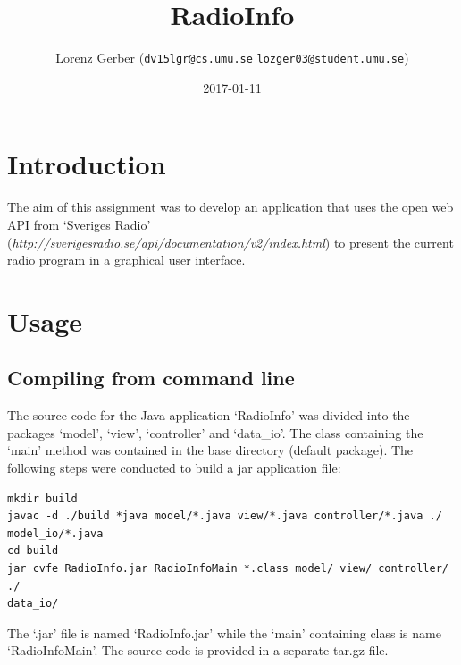 \documentclass[a4paper,11pt,twoside]{article}
\title{RadioInfo}
\author{Lorenz Gerber ({\tt{dv15lgr@cs.umu.se}} {\tt{lozger03@student.umu.se}})}
\date{2017-01-11}
\begin{document}
\lstset{language=C}
\maketitle
\thispagestyle{empty}
\newpage
\tableofcontents
\thispagestyle{empty}
\newpage

\clearpage
{}

\section{Introduction}
The aim of this assignment was to develop an application that uses the open web API from `Sveriges Radio' (\textit{http://sverigesradio.se/api/documentation/v2/index.html}) to present the current radio program in a graphical user interface. 

\section{Usage} 

\subsection{Compiling from command line}
The source code for the Java application `RadioInfo' was divided into the packages `model', `view', `controller' and `data\_io'. The class containing the `main' method was contained in the base directory (default package). The following steps were conducted to build a jar application file:

\begin{verbatim}
mkdir build
javac -d ./build *java model/*.java view/*.java controller/*.java ./
model_io/*.java
cd build
jar cvfe RadioInfo.jar RadioInfoMain *.class model/ view/ controller/ ./
data_io/
\end{verbatim}

The `.jar' file is named `RadioInfo.jar' while the `main' containing class is name `RadioInfoMain'. The source code is provided in a separate tar.gz file. 
\end{document}
